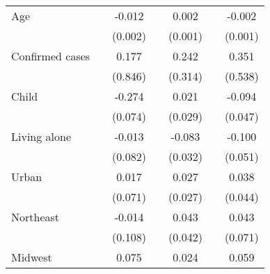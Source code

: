 {\begin{tabular}{l*{6}{c}}
Age                 &                     &      -0.012\sym{***}&                     &       0.002\sym{***}&                     &      -0.002\sym{**} \\
                    &                     &     (0.002)         &                     &     (0.001)         &                     &     (0.001)         \\
\addlinespace
Confirmed cases     &                     &       0.177         &                     &       0.242         &                     &       0.351         \\
                    &                     &     (0.846)         &                     &     (0.314)         &                     &     (0.538)         \\
\addlinespace
Child               &                     &      -0.274\sym{***}&                     &       0.021         &                     &      -0.094\sym{**} \\
                    &                     &     (0.074)         &                     &     (0.029)         &                     &     (0.047)         \\
\addlinespace
Living alone        &                     &      -0.013         &                     &      -0.083\sym{***}&                     &      -0.100\sym{**} \\
                    &                     &     (0.082)         &                     &     (0.032)         &                     &     (0.051)         \\
\addlinespace
Urban               &                     &       0.017         &                     &       0.027         &                     &       0.038         \\
                    &                     &     (0.071)         &                     &     (0.027)         &                     &     (0.044)         \\
\addlinespace
Northeast           &                     &      -0.014         &                     &       0.043         &                     &       0.043         \\
                    &                     &     (0.108)         &                     &     (0.042)         &                     &     (0.071)         \\
\addlinespace
Midwest             &                     &       0.075         &                     &       0.024         &                     &       0.059         \\

\end{tabular}}
